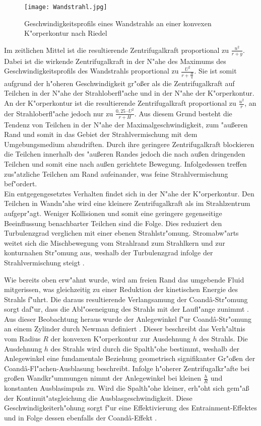 \begin{figure}[h]
	\centering
	\texttt{[image: Wandstrahl.jpg]}
	\caption{Geschwindigkeitsprofils eines Wandstrahls an einer konvexen K"orperkontur nach Riedel \cite{Riedel.1973}}
	\label{fig:Wandstrahl}
\end{figure}

Im zeitlichen Mittel ist die resultierende Zentrifugalkraft proportional zu $\frac{u^2}{r+y}$. Dabei ist die wirkende Zentrifugalkraft in der N"ahe des Maximums des Geschwindigkeitsprofils des Wandstrahls proportional zu $\frac{U^2}{r+\frac{H}{4}}$. Sie ist somit aufgrund der h"oheren Geschwindigkeit gr"o\ss{}er als die Zentrifugalkraft auf Teilchen in der N"ahe der Strahloberfl"ache und in der N"ahe der K"orperkontur.\\
An der K"orperkontur ist die resultierende Zentrifugalkraft proportional zu $\frac{u^2}{r}$, an der Strahloberfl"ache jedoch nur zu $\frac{0,25 \cdot U^2}{r + H}$. Aus diesem Grund besteht die Tendenz von Teilchen in der N"ahe der Maximalgeschwindigkeit, zum "au\ss{}eren Rand und somit in das Gebiet der Strahlvermischung mit dem Umgebungsmedium abzudriften. Durch ihre geringere Zentrifugalkraft blockieren die Teilchen innerhalb des "au\ss{}eren Randes jedoch die nach au\ss{}en dringenden Teilchen und somit eine nach au\ss{}en gerichtete Bewegung. Infolgedessen treffen zus"atzliche Teilchen am Rand aufeinander, was feine Strahlvermischung bef"ordert.\\
Ein entgegengesetztes Verhalten findet sich in der N"ahe der K"orperkontur. Den Teilchen in Wandn"ahe wird eine kleinere Zentrifugalkraft als im Strahlzentrum aufgepr"agt. Weniger Kollisionen und somit eine geringere gegenseitige Beeinflussung benachbarter Teilchen sind die Folge. Dies reduziert den Turbulenzgrad verglichen mit einer ebenen Strahlstr"omung.
Stromabw"arts weitet sich die Mischbewegung vom Strahlrand zum Strahlkern und zur konturnahen Str"omung aus, weshalb der Turbulenzgrad infolge der Strahlvermischung steigt \cite{Riedel.1973}. 

Wie bereits oben erw"ahnt wurde, wird am freien Rand das umgebende Fluid mitgerissen, was gleichzeitig zu einer Reduktion der kinetischen Energie des Strahls f"uhrt. Die daraus resultierende Verlangsamung der Coand\^{a}-Str"omung sorgt daf"ur, dass die Abl"oseneigung des Strahls mit der Laufl"ange zunimmt \cite{Fischer.2011}. Aus dieser Beobachtung heraus wurde der Anlegewinkel f"ur Coand\^{a}-Str"omung an einem Zylinder durch Newman definiert \cite{Newman.1961}. Dieser beschreibt das Verh"altnis vom Radius $R$ der konvexen K"orperkontur zur Ausdehnung $h$ des Strahls. Die Ausdehnung $h$ des Strahls wird durch die Spalth"ohe bestimmt, weshalb der Anlegewinkel eine fundamentale Beziehung geometrisch signifikanter Gr"o\ss{}en der Coand\^{a}-Fl"achen-Ausblasung beschreibt. Infolge h"oherer Zentrifugalkr"afte bei gro\ss{}en Wandkr"ummungen nimmt der Anlegewinkel bei kleinen $\frac{h}{R}$ und konstanten Ausblasimpuls zu. Wird die Spalth"ohe kleiner, erh"oht sich gem"a\ss{} der Kontinuit"atsgleichung die Ausblasgeschwindigkeit. Diese Geschwindigkeiterh"ohung sorgt f"ur eine Effektivierung des Entrainment-Effektes und in Folge dessen ebenfalls der Coand\^{a}-Effekt \cite{Fischer.2011}.


